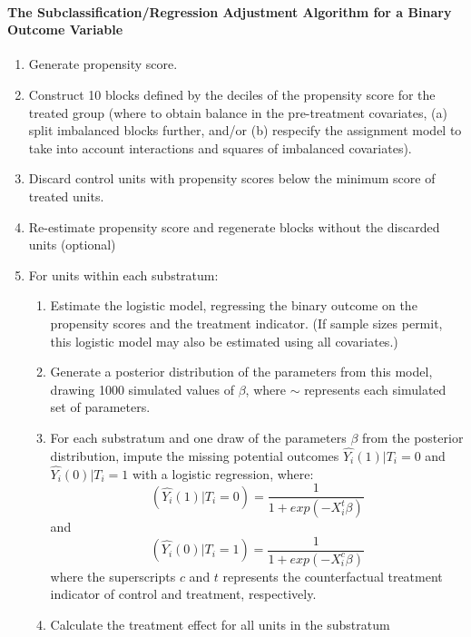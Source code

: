 \documentclass[11pt,titlepage]{article}
\begin{document}
\paragraph{The Subclassification/Regression Adjustment Algorithm for a Binary Outcome
  Variable}
\begin{enumerate}
\item Generate propensity score.
\item Construct 10 blocks defined by the deciles of the propensity
  score for the treated group (where to obtain balance
  in the pre-treatment covariates, (a) split imbalanced blocks further, and/or
  (b) respecify the assignment model
  to take into account interactions and squares of imbalanced
  covariates).
\item Discard control units with propensity scores below the minimum
  score of treated units.
\item Re-estimate propensity score and regenerate blocks without the
  discarded units (optional)
\item For units within each substratum: \label{sub}
  \begin{enumerate}
  \item{Estimate the logistic model, regressing
      the binary outcome on the propensity scores and the treatment
      indicator.  (If sample sizes permit, this logistic model may
      also be estimated using all covariates.)} \label{sub1}
  \item{Generate a posterior distribution of the parameters from this
      model, drawing 1000 simulated values of $\beta$, where $\sim$
      represents each simulated set of parameters.}
  \item{For each substratum and one draw of the parameters $\beta$ from the
      posterior distribution, impute the missing potential outcomes
      $\hat{Y_i}(1)|T_i=0$ and $\hat{Y_i}(0)|T_i=1$ with a logistic regression,
      where:
      \begin{equation}
        (\hat{Y_i}(1)|T_i=0) = \frac{1}{1+exp(-X_i^t \beta)}
      \end{equation}
      and 
      \begin{equation}
        (\hat{Y_i}(0)|T_i=1) = \frac{1}{1+exp(-X_i^c \beta)}
      \end{equation}
      where the superscripts $c$ and $t$ represents the counterfactual
      treatment indicator of control and treatment, respectively.}
  \item{Calculate the treatment effect for all units 
      in the substratum
      \begin{equation}

\end{equation}}
\end{enumerate}
\end{enumerate}
\end{document}
